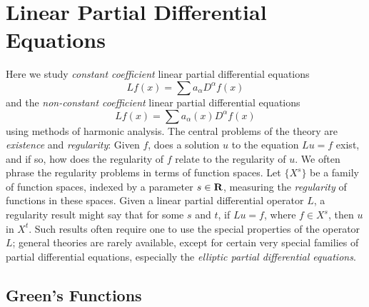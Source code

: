 \part{Linear Partial Differential Equations}

Here we study \emph{constant coefficient} linear partial differential equations
%
\[ Lf(x) = \sum a_\alpha D^\alpha f(x) \]
%
and the \emph{non-constant coefficient} linear partial differential equations
%
\[ Lf(x) = \sum a_\alpha(x) D^\alpha f(x) \]
%
using methods of harmonic analysis. The central problems of the theory are \emph{existence} and \emph{regularity}: Given $f$, does a solution $u$ to the equation $Lu = f$ exist, and if so, how does the regularity of $f$ relate to the regularity of $u$. We often phrase the regularity problems in terms of function spaces. Let $\{ X^s \}$ be a family of function spaces, indexed by a parameter $s \in \operatorname{\mathbf{R}}$, measuring the \emph{regularity} of functions in these spaces. Given a linear partial differential operator $L$, a regularity result might say that for some $s$ and $t$, if $Lu = f$, where $f \in X^s$, then $u$ in $X^t$. Such results often require one to use the special properties of the operator $L$; general theories are rarely available, except for certain very special families of partial differential equations, especially the \emph{elliptic partial differential equations}.

\chapter{Green's Functions}

